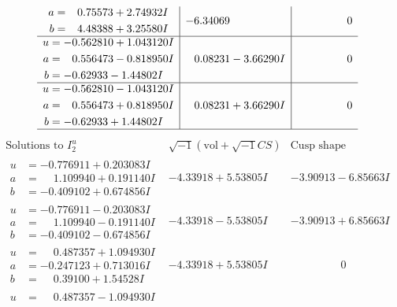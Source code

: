 \documentclass[1p]{elsarticle_modified}
\theoremstyle{definition}
\newcommand{\I}{\sqrt{-1}}
\begin{document}
$$\begin{array}{c|c|c}
\begin{aligned}
a &= \phantom{-}0.75573 + 2.74932 I \\
b &= \phantom{-}4.48388 + 3.25580 I\end{aligned}
 & -6.34069\phantom{ +0.000000I} & \phantom{-0.000000 } 0 \\ \hline\begin{aligned}
u &= -0.562810 + 1.043120 I \\
a &= \phantom{-}0.556473 - 0.818950 I \\
b &= -0.62933 - 1.44802 I\end{aligned}
 & \phantom{-}0.08231 - 3.66290 I & \phantom{-0.000000 } 0 \\ \hline\begin{aligned}
u &= -0.562810 - 1.043120 I \\
a &= \phantom{-}0.556473 + 0.818950 I \\
b &= -0.62933 + 1.44802 I\end{aligned}
 & \phantom{-}0.08231 + 3.66290 I & \phantom{-0.000000 } 0\\
 \hline 
 \end{array}$$\newpage$$\begin{array}{c|c|c}  
\text{Solutions to }I^u_{2}& \I (\text{vol} + \sqrt{-1}CS) & \text{Cusp shape}\\
 \hline 
\begin{aligned}
u &= -0.776911 + 0.203083 I \\
a &= \phantom{-}1.109940 + 0.191140 I \\
b &= -0.409102 + 0.674856 I\end{aligned}
 & -4.33918 + 5.53805 I & -3.90913 - 6.85663 I \\ \hline\begin{aligned}
u &= -0.776911 - 0.203083 I \\
a &= \phantom{-}1.109940 - 0.191140 I \\
b &= -0.409102 - 0.674856 I\end{aligned}
 & -4.33918 - 5.53805 I & -3.90913 + 6.85663 I \\ \hline\begin{aligned}
u &= \phantom{-}0.487357 + 1.094930 I \\
a &= -0.247123 + 0.713016 I \\
b &= \phantom{-}0.39100 + 1.54528 I\end{aligned}
 & -4.33918 + 5.53805 I & \phantom{-0.000000 } 0 \\ \hline\begin{aligned}
u &= \phantom{-}0.487357 - 1.094930 I \\

\end{aligned}
\end{array}$$
\end{document}
